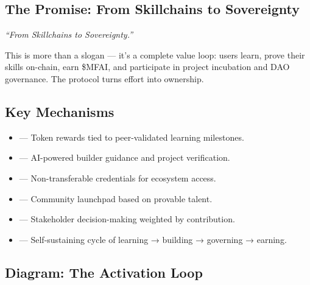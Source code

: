 \vspace{1.5em}

\subsection*{The Promise: From Skillchains to Sovereignty}

\begin{center}
  \textit{“From Skillchains to Sovereignty.”}
\end{center}

This is more than a slogan — it's a complete value loop: users learn, prove their skills on-chain, earn \$MFAI, and participate in project incubation and DAO governance. The protocol turns effort into ownership.

\vspace{1em}
\subsection*{Key Mechanisms}

\begin{itemize}
  \item {} — Token rewards tied to peer-validated learning milestones.
  \item {} — AI-powered builder guidance and project verification.
  \item {} — Non-transferable credentials for ecosystem access.
  \item {} — Community launchpad based on provable talent.
  \item {} — Stakeholder decision-making weighted by contribution.
  \item {} — Self-sustaining cycle of learning → building → governing → earning.
\end{itemize}

\vspace{2em}
\subsection*{Diagram: The Activation Loop}

\begin{center}

\end{center}

\vspace{2em}

